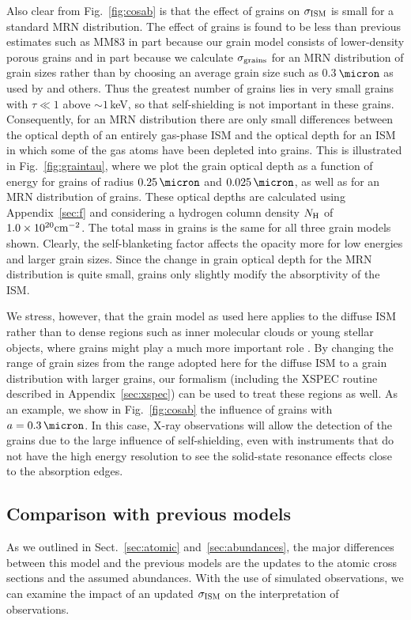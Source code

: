 \documentclass{aastex}
\newcommand{\nH}{\ensuremath{N_{\rm H}}}
\newcommand{\sigism}{\ensuremath{\sigma_{\rm ISM}}}
\begin{document}
Also clear from Fig.~\ref{fig:cosab} is that the effect of grains on
$\sigism$ is small for a standard MRN distribution. The effect of
grains is found to be less than previous estimates such as MM83 in
part because our grain model consists of lower-density porous grains
and in part because we calculate $\sigma_{\rm grains}$ for an MRN
distribution of grain sizes rather than by choosing an average grain
size such as 0.3\,$\micron$ as used by \citeauthor{fireman:74a} and
others. Thus the greatest number of grains lies in very small grains
with $\tau\ll 1$ above $\sim 1$\,keV, so that self-shielding is not
important in these grains.  Consequently, for an MRN distribution
there are only small differences between the optical depth of an
entirely gas-phase ISM and the optical depth for an ISM in which some
of the gas atoms have been depleted into grains.  This is illustrated
in Fig.~\ref{fig:graintau}, where we plot the grain optical depth as a
function of energy for grains of radius $0.25\,\micron$ and
$0.025\,\micron$, as well as for an MRN distribution of grains.  These
optical depths are calculated using Appendix~\ref{sec:f} and
considering a hydrogen column density $\nH$ of $1.0 \times 10^{20}
{\rm cm}^{-2}$.  The total mass in grains is the same for all three
grain models shown.  Clearly, the self-blanketing factor affects the
opacity more for low energies and larger grain sizes.  Since the
change in grain optical depth for the MRN distribution is quite small,
grains only slightly modify the absorptivity of the ISM.

We stress, however, that the grain model as used here applies to the
diffuse ISM rather than to dense regions such as inner molecular
clouds or young stellar objects, where grains might play a much more
important role \citep{mathis:90a}. By changing the range of grain
sizes from the range adopted here for the diffuse ISM to a grain
distribution with larger grains, our formalism (including the XSPEC
routine described in Appendix~\ref{sec:xspec}) can be used to treat
these regions as well. As an example, we show in Fig.~\ref{fig:cosab}
the influence of grains with $a=0.3\,\micron$. In this case, X-ray
observations will allow the detection of the grains due to the large
influence of self-shielding, even with instruments that do not have
the high energy resolution to see the solid-state resonance effects
close to the absorption edges.


\subsection{Comparison with previous models}
As we outlined in Sect.~\ref{sec:atomic} and~\ref{sec:abundances}, the
major differences between this model and the previous models are the
updates to the atomic cross sections and the assumed abundances. With
the use of simulated observations, we can examine the impact of an
updated $\sigism$ on the interpretation of observations.
\end{document}
